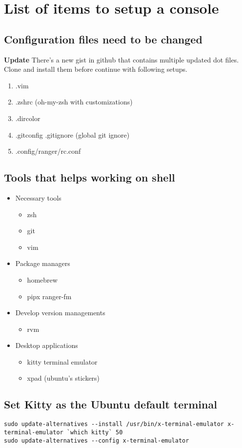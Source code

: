\chapter{List of items to setup a console}

\section{Configuration files need to be changed}

\textbf{Update} There's a new gist in github that contains multiple updated dot files. Clone and install them before 
continue with following setups.

\begin{enumerate}
	\item .vim
	\item .zshrc (oh-my-zsh with customizations)
	\item .dircolor
  \item .gitconfig .gitignore (global git ignore)
  \item .config/ranger/rc.conf
\end{enumerate}

\section{Tools that helps working on shell}

\begin{itemize}
  \item Necessary tools
    \begin{itemize}
      \item zsh
      \item git
      \item vim
    \end{itemize}
  \item Package managers
    \begin{itemize}
      \item homebrew
      \item pipx \quad\Rightarrow\quad ranger-fm
    \end{itemize}
  \item Develop version managements
    \begin{itemize}
      \item rvm
    \end{itemize}
  \item Desktop applications
    \begin{itemize}
      \item kitty terminal emulator
      \item xpad (ubuntu's stickers)
    \end{itemize}
\end{itemize}

\section{Set Kitty as the Ubuntu default terminal}

\begin{verbatim}
sudo update-alternatives --install /usr/bin/x-terminal-emulator x-terminal-emulator `which kitty` 50
sudo update-alternatives --config x-terminal-emulator
\end{verbatim}

